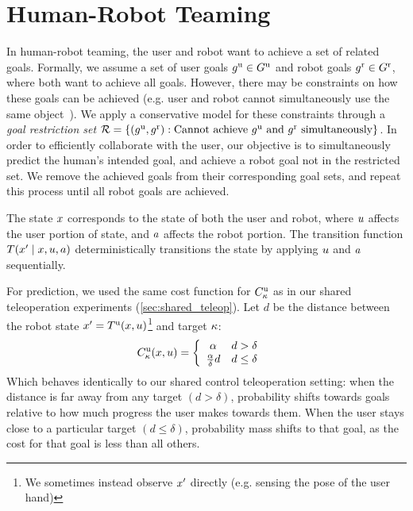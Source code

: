 \section{Human-Robot Teaming}
\label{sec:human_robot_teaming}


In human-robot teaming, the user and robot want to achieve a set of related goals. Formally, we assume a set of user goals $g^{\text{u}} \in G^{\text{u}}$ and robot goals $g^{\text{r}} \in G^{\text{r}}$, where both want to achieve all goals. However, there may be constraints on how these goals can be achieved (e.g. user and robot cannot simultaneously use the same object~\citep{hoffman_2007}). We apply a conservative model for these constraints through a \emph{goal restriction set} $\mathcal{R} = \left\{ (g^{\text{u}}, g^{\text{r}}) : \text{Cannot achieve $g^{\text{u}}$ and $g^{\text{r}}$ simultaneously}\right\}$. In order to efficiently collaborate with the user, our objective is to simultaneously predict the human's intended goal, and achieve a robot goal not in the restricted set. We remove the achieved goals from their corresponding goal sets, and repeat this process until all robot goals are achieved.

The state $x$ corresponds to the state of both the user and robot, where $u$ affects the user portion of state, and $a$ affects the robot portion. The transition function $T(x' \mid x, u, a)$ deterministically transitions the state by applying $u$ and $a$ sequentially.

For prediction, we used the same cost function for $C_{\kappa}^{\text{u}}$ as in our shared teleoperation experiments (\cref{sec:shared_teleop}). Let $d$ be the distance between the robot state $x' = T^{\text{u}}(x, u)$\footnote{We sometimes instead observe $x'$ directly (e.g. sensing the pose of the user hand)} and target $\kappa$:
\begin{align*}
  C_{\kappa}^{\text{u}}(x, u) &= \left\{ \begin{array}{cc} \alpha & d > \delta \\ \frac{\alpha}{\delta} d & d\leq \delta \end{array} \right.
\end{align*}
Which behaves identically to our shared control teleoperation setting: when the distance is far away from any target $(d > \delta)$, probability shifts towards goals relative to how much progress the user makes towards them. When the user stays close to a particular target $(d \leq \delta)$, probability mass shifts to that goal, as the cost for that goal is less than all others.

